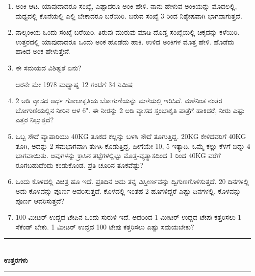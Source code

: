 \begin{enumerate}
{\bf ಆಶಯ :} ಒಬ್ಬ ಕೂಡಿಗ (ಹಾಲು ಮಾರುವವನು). ಅವನಿಗೆ 9 ಹೆಂಡತಿಯರು. 81 ಎಮ್ಮೆಗಳನ್ನು ಕೊಂಡು ತರುತ್ತಾನೆ. 1ನೆ ಎಮ್ಮೆ 1 ಅಳತೆ, 2ನೆ ಎಮ್ಮೆ  2 ಅಳತೆ . . . .  81ನೆ ಎಮ್ಮೆ 81 ಅಳತೆ ಹಾಲು ಕೊಡುತ್ತದೆ. ಹೆಂಡತಿಯರಿಗೆ ರಾಸೂ ಸಮ, ಹಾಲೂ ಸಮ ಆಗುವಂತೆ ಹಂಚಿ. 

\item ಅಂಕಿ ಆಟ. ಯಾವುದಾದರೂ ಸಂಖ್ಯೆ, ಎಷ್ಟಾದರೂ ಅಂಕಿ ಹೇಳಿ. ನಾನು ಹೇಳುವ ಅಂಕಿಯನ್ನು ಮೊದಲಲ್ಲಿ, ಮಧ್ಯದಲ್ಲಿ ಕೊನೆಯಲ್ಲಿ ಎಲ್ಲಿ ಬೇಕಾದರೂ ಬರೆಯಿರಿ. ಬರುವ ಸಂಖ್ಯೆ 3 ರಿಂದ ನಿಶ್ಶೇಷವಾಗಿ ಭಾಗವಾಗುತ್ತದೆ.

\item ನಾಲ್ಕಂಕಿಯ ಒಂದು ಸಂಖ್ಯೆ ಬರೆಯಿರಿ. ತಿರುವು ಮುರುವು ಮಾಡಿ ದೊಡ್ಡ ಸಂಖ್ಯೆಯಲ್ಲಿ ಚಿಕ್ಕದನ್ನು ಕಳೆಯಿರಿ. ಉತ್ತರದಲ್ಲಿ ಯಾವುದಾದರೂ ಒಂದು ಅಂಕ ಹೊಡೆದು ಹಾಕಿ. ಉಳಿದ ಅಂಕಿಗಳ ಮೊತ್ತ ಹೇಳಿ. ಹೊಡೆದು ಹಾಕಿದ ಅಂಕ ಹೇಳುತ್ತೇನೆ.

\item ಈ ಸಮಯದ ವಿಶಿಷ್ಟತೆ ಏನು?

ಆರನೇ ಮೇ 1978 ಮಧ್ಯಾಹ್ನ 12 ಗಂಟೆಗೆ 34 ನಿಮಿಷ 

\item 2 ಅಡಿ ವ್ಯಾಸದ ಅರ್ಧ ಗೋಲಾಕೃತಿಯ ಬೋಗುಣಿಯನ್ನು ಮಳೆಯಲ್ಲಿ ಇರಿಸಿದೆ. ಮಳೆನಿಂತ ನಂತರ ಬೋಗು‌ಣಿಯಲ್ಲಿನ ನೀರಿನ ಆಳ 6". ಈ ನೀರನ್ನು 2 ಅಡಿ ವ್ಯಾಸದ ಸ್ತಂಭಾಕೃತಿ ಪಾತ್ರೆಗೆ ಹಾಕಿದರೆ, ನೀರು ಎಷ್ಟು ಎತ್ತರ ನಿಲ್ಲುತ್ತದೆ? 

\item ಒಬ್ಬ ಸೌದೆ ವ್ಯಾಪಾರಿಯು 40KG ತೂಕದ ಕಲ್ಲನ್ನು ಬಳಸಿ ಸೌದೆ ತೂಗುತ್ತಿದ್ದ. 20KG ಕೇಳಿದವರಿಗೆ 40KG ತೂಗಿ, ಅದನ್ನು 2 ಸಮಭಾಗವಾಗಿ ತುಗಿಸಿ ಕೊಡುತ್ತಿದ್ದ. ಹೀಗೆಯೇ 10, 5 ಇತ್ಯಾದಿ. ಒಮ್ಮೆ ಕಲ್ಲು ಕೆಳಗೆ ಬಿದ್ದು 4 ಭಾಗವಾಯಿತು. ಅವುಗಳನ್ನು ಕ್ರಾಸಿನ ತಟ್ಟೆಗಳಲ್ಲಿಟ್ಟು ಮೊತ್ತ-ವ್ಯತ್ಯಾಸದಿಂದ 1 ರಿಂದ 40KG ವರೆಗೆ ರೂಗಬಹುದೆಂದು ಕಂಡುಕೊಂಡ. ಪ್ರತಿ ಚೂರಿನ ತೂಕವೆಷ್ಟು? 

\item ಒಂದು ಕೊಳದಲ್ಲಿ ವಿಚಿತ್ರ ಹೂ ಇದೆ. ಪ್ರತಿದಿನ ಅದು ತನ್ನ ವಿಸ್ತೀರ್ಣವನ್ನು ದ್ವಿಗುಣಗೊಳಿಸುತ್ತದೆ. 20 ದಿನಗಳಲ್ಲಿ ಅದು ಕೊಳವನ್ನು ಪೂರ್ಣ ಆವರಿಸುತ್ತದೆ. ಕೊಳದಲ್ಲಿ ಇಂತಹ 2 ಹೂಗಳಿದ್ದರೆ ಎಷ್ಟು ದಿನಗಳಲ್ಲಿ, ಕೊಳವನ್ನು ಪೂರ್ಣ ಆವರಿಸುತ್ತದೆ?

\item 100 ಮೀಟರ್ ಉದ್ದದ ಟೇಪಿನ ಒಂದು ಸುರುಳಿ ಇದೆ. ಅದರಿಂದ 1 ಮೀಟರ್ ಉದ್ದದ ಟೇಪು ಕತ್ತರಿಸಲು 1 ಸೆಕೆಂಡ್ ಬೇಕು. 1 ಮೀಟರ್ ಉದ್ದದ 100 ಟೇಪು ಕತ್ತರಿಸಲು ಎಷ್ಟು ಸಮಯಬೇಕು? 
\end{enumerate}

\eject

\begin{center}
\rule{5cm}{1pt}\\[3pt]
{\Large\bfseries ಉತ್ತರಗಳು}\\[-0.1cm]
\rule{5cm}{1pt}
\end{center}

